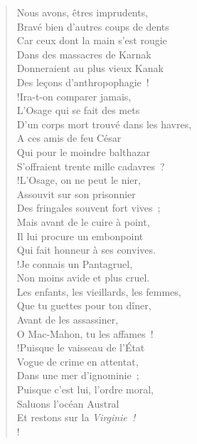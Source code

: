 \documentclass[french,twoside]{book} %
\newenvironment{quoteblock}%
  {\begin{quoting}}
  {\end{quoting}}
\newenvironment{quotebar}{%
    \def\FrameCommand{{\color{rubric!10!}\vrule width 0.5em} \hspace{0.9em}}%
    \def\OuterFrameSep{\itemsep} %
    \MakeFramed {\advance\hsize-\width \FrameRestore}
  }%
  {%
    \endMakeFramed
  }
\renewenvironment{quoteblock}%
  {%
    \savenotes
    \setstretch{0.9}
    \normalfont
    \begin{quotebar}
  }
  {%
    \end{quotebar}
    \spewnotes
  }
\begin{document}
\begin{verse}
Nous avons, êtres imprudents,\\
Bravé bien d’autres coups de dents\\
Car ceux dont la main s’est rougie\\
Dans des massacres de Karnak\\
Donneraient au plus vieux Kanak\\
Des leçons d’anthropophagie !\\!Ira-t-on comparer jamais,\\
L’Osage qui se fait des mets\\
D’un corps mort trouvé dans les havres,\\
A ces amis de feu César\\
Qui pour le moindre balthazar\\
S’offraient trente mille cadavres ?\\!L’Osage, on ne peut le nier,\\
Assouvit sur son prisonnier\\
Des fringales souvent fort vives ;\\
Mais avant de le cuire à point,\\
Il lui procure un embonpoint\\
Qui fait honneur à ses convives.\\!Je connais un Pantagruel,\\
Non moins avide et plus cruel.\\
Les enfants, les vieillards, les femmes,\\
Que tu guettes pour ton dîner,\\
Avant de les assassiner,\\
O Mac-Mahon, tu les affames !\\!Puisque le vaisseau de l’État\\
Vogue de crime en attentat,\\
Dans une mer d’ignominie ;\\
Puisque c’est lui, l’ordre moral,\\
Saluons l’océan Austral\\
Et restons sur la \emph{Virginie !}\\!
\end{verse}
\begin{quoteblock}
 \end{quoteblock}
\end{document}
